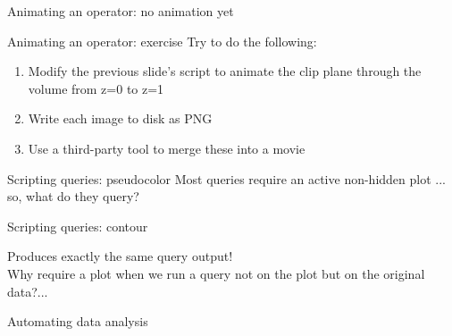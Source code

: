 \begin{frame}{Animating an operator: no animation yet}
  
\end{frame}

\begin{frame}{Animating an operator: exercise}
  \qquad Try to do the following:\bigskip
  \begin{enumerate}\setlength{\itemsep}{3mm}
  \item Modify the previous slide's script to animate the clip plane through the volume from z=0 to z=1
  \item Write each image to disk as PNG
  \item Use a third-party tool to merge these into a movie
  \end{enumerate}
\end{frame}


\begin{frame}{Scripting queries: pseudocolor}
  Most queries require an active non-hidden plot ... so, what do they query?
  
  \begin{block}{}{}\vspace{-3mm}\outIdentical\vspace{-3mm}\end{block}
\end{frame}

\begin{frame}{Scripting queries: contour}
  
  \pause
  Produces exactly the same query output!\\
  Why require a plot when we run a query not on the plot but on the original data?...
\end{frame}

\begin{frame}{Automating data analysis}
\end{frame}

